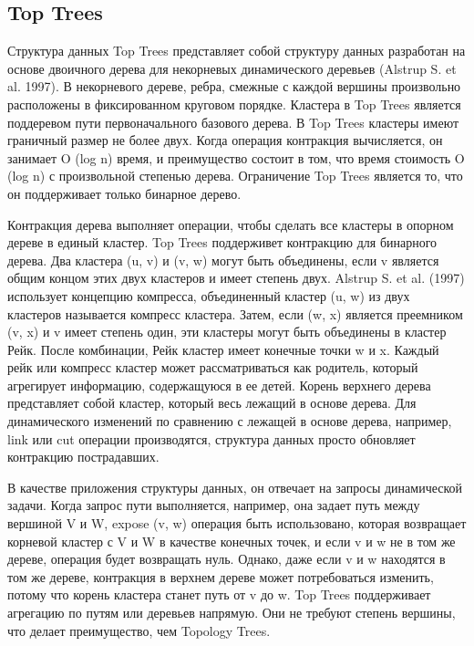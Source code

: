 \documentclass[specification,annotation]{itmo-student-thesis}
\newcommand{\revise}[1]{{\color{red!70!black} #1 }}
\begin{document}
\subsection{Top Trees}

\revise{
Структура данных Top Trees представляет собой структуру данных разработан на основе двоичного дерева для некорневых динамического деревьев (Alstrup S. et al. 1997). В некорневого дереве, ребра, смежные с 
каждой вершины произвольно расположены в фиксированном круговом порядке. Кластера в Top Trees является поддеревом пути первоначального базового дерева. В Top Trees кластеры имеют граничный размер не более 
двух. Когда операция контракция вычисляется, он занимает O (log n) время, и преимущество состоит в том, что время стоимость O (log n) с произвольной степенью дерева. Ограничение Top Trees является то, что 
он поддерживает только бинарное дерево.
}

\revise{
Контракция дерева выполняет операции, чтобы сделать все кластеры в опорном дереве в единый кластер. Top Trees поддерживет контракцию для бинарного дерева. Два кластера (u, v) и (v, w) могут быть 
объединены, если v является общим концом этих двух кластеров и имеет степень двух. Alstrup S. et al. (1997) использует концепцию компресса, объединенный кластер (u, w) из двух кластеров называется 
компресс кластера. Затем, если (w, x) является преемником (v, x) и v имеет степень один, эти кластеры могут быть объединены в кластер Рейк. После комбинации, Рейк кластер имеет конечные точки w и x. 
Каждый рейк или компресс кластер может рассматриваться как родитель, который агрегирует информацию, содержащуюся в ее детей. Корень верхнего дерева представляет собой кластер, который весь лежащий в 
основе дерева. Для динамического изменений по сравнению с лежащей в основе дерева, например, link или cut операции производятся, структура данных просто обновляет контракцию пострадавших. 
}

\revise{
В качестве приложения структуры данных, он отвечает на запросы динамической задачи. Когда запрос пути выполняется, например, она задает путь между вершиной V и W, expose (v, w) операция быть использовано, 
которая возвращает корневой кластер с V и W в качестве конечных точек, и если v и w не в том же дереве, операция будет возвращать нуль. Однако, даже если v и w находятся в том же дереве, контракция в 
верхнем дереве может потребоваться изменить, потому что корень кластера станет путь от v до w. Top Trees поддерживает агрегацию по путям или деревьев напрямую. Они не требуют степень вершины, что делает 
преимущество, чем Topology Trees. 
}
\end{document}
